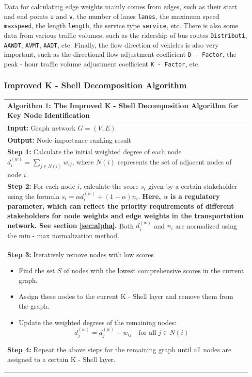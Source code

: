 \documentclass{mcmthesis}
\begin{document}
Data for calculating edge weights mainly comes from edges, such as their start and end points \texttt{u} and \texttt{v}, the number of lanes \texttt{lanes}, the maximum speed \texttt{maxspeed}, the length \texttt{length}, the service type \texttt{service}, etc. There is also some data from various traffic volumes, such as the ridership of bus routes \texttt{Distributi}, \texttt{AAWDT}, \texttt{AVMT}, \texttt{AADT}, etc. Finally, the flow direction of vehicles is also very important, such as the directional flow adjustment coefficient \texttt{D - Factor}, the peak - hour traffic volume adjustment coefficient \texttt{K - Factor}, etc.

\subsubsection{Improved K - Shell Decomposition Algorithm}

\begin{table}[H]
  \centering
  \label{tab:improvedKshell}
  \begin{tabular}{@{}p{}@{}}
  \toprule
  \textbf{Algorithm 1: The Improved K - Shell Decomposition Algorithm for Key Node Identification} \\ 
  \midrule
  \textbf{Input:} Graph network \(G=(V, E)\) \\
  \textbf{Output:} Node importance ranking result \\
  \textbf{Step 1:} Calculate the initial weighted degree of each node \(d_i^{(w)}=\sum_{j\in N(i)}w_{ij}\), where \(N(i)\) represents the set of adjacent nodes of node \(i\). \\
  \textbf{Step 2:} For each node \(i\), calculate the score \(s_i\) given by a certain stakeholder using the formula \(s_i=\alpha d_i^{(w)}+(1 - \alpha)n_i\). \textbf{Here, \(\alpha\) is a regulatory parameter, which can reflect the priority requirements of different stakeholders for node weights and edge weights in the transportation network. See section \ref{sec:alpha}.} Both \(d_i^{(w)}\) and \(n_i\) are normalized using the min - max normalization method. \\
  \textbf{Step 3:} Iteratively remove nodes with low scores
  \begin{itemize}
      \item Find the set \(S\) of nodes with the lowest comprehensive scores in the current graph.
      \item Assign these nodes to the current K - Shell layer and remove them from the graph.
      \item Update the weighted degrees of the remaining nodes:
      \begin{equation}
          d_j^{(w)}=d_j^{(w)}-w_{ij}\quad\text{for all }j\in N(i)
      \end{equation}
  \end{itemize}
  \textbf{Step 4:} Repeat the above steps for the remaining graph until all nodes are assigned to a certain K - Shell layer. \\ \bottomrule
  \end{tabular}
\end{table}
\end{document}
